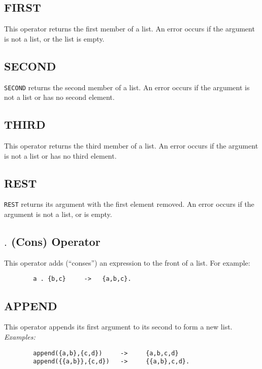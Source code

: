 \subsection{FIRST}
\hypertarget{operator:FIRST}{}

This operator returns the first member of a list.  An error
occurs if the argument is not a list, or the list is empty.

\subsection{SECOND}
\hypertarget{operator:SECOND}{}

{\tt SECOND} returns the second member of a list.  An error
occurs if the argument is not a list or has no second element.

\subsection{THIRD}
\hypertarget{operator:THIRD}{}

This operator returns the third member of a list.  An error
occurs if the argument is not a list or has no third element.

\subsection{REST}
\hypertarget{operator:REST}{}

{\tt REST} returns its argument with the first element
removed.  An error occurs if the argument is not a list, or is empty.

\subsection{$.$ (Cons) Operator}
\hypertarget{operator:CONS}{}
\hypertarget{reserved:consop}{}

This operator adds (``conses'') an expression to the
front of a list.  For example:
\begin{verbatim}
        a . {b,c}     ->   {a,b,c}.
\end{verbatim}

\subsection{APPEND}
\hypertarget{operator:APPEND}{}

This operator appends its first argument to its second to
form a new list.
{\it Examples:}
\begin{verbatim}
        append({a,b},{c,d})     ->     {a,b,c,d}
        append({{a,b}},{c,d})   ->     {{a,b},c,d}.
\end{verbatim}

